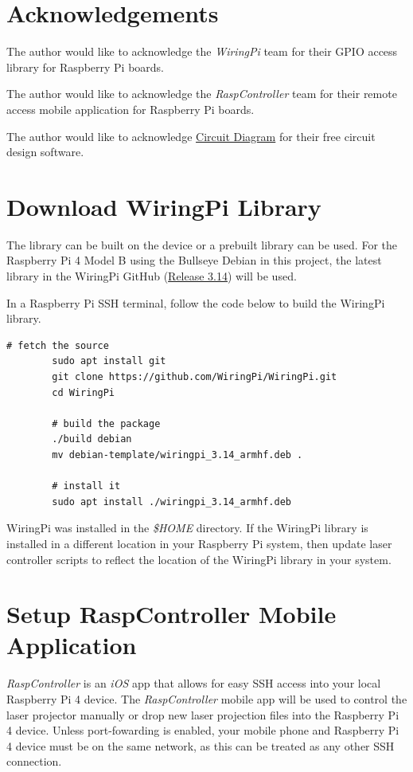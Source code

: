 \documentclass[journal]{IEEEtran}
\begin{document}
    \newpage
    \section{Acknowledgements}
    The author would like to acknowledge the \emph{WiringPi} team for their GPIO access library for Raspberry Pi boards. \newline

    The author would like to acknowledge the \emph{RaspController} team for their remote access mobile application for Raspberry Pi boards.

    The author would like to acknowledge {\href{https://www.circuit-diagram.org/editor/}{Circuit Diagram}} for their free circuit design software. 

    \newpage
    \appendices
    \section{Download WiringPi Library}
    The library can be built on the device or a prebuilt library can be used. 
    For the Raspberry Pi 4 Model B using the Bullseye Debian in this project, the latest library in the WiringPi GitHub ({\href{https://github.com/WiringPi/WiringPi/releases/tag/3.14}{Release 3.14}}) will be used.

    In a Raspberry Pi SSH terminal, follow the code below to build the WiringPi library.
    \begin{lstlisting}[frame=single, basicstyle=\ttfamily\footnotesize, breaklines=true]
        # fetch the source
        sudo apt install git
        git clone https://github.com/WiringPi/WiringPi.git
        cd WiringPi

        # build the package
        ./build debian
        mv debian-template/wiringpi_3.14_armhf.deb .

        # install it
        sudo apt install ./wiringpi_3.14_armhf.deb
    \end{lstlisting}

    WiringPi was installed in the \emph{\$HOME} directory. 
    If the WiringPi library is installed in a different location in your Raspberry Pi system, then update laser controller scripts to reflect the location of the WiringPi library in your system.

    \section{Setup RaspController Mobile Application}
    \emph{RaspController} is an \emph{iOS} app that allows for easy SSH access into your local Raspberry Pi 4 device.
    The \emph{RaspController} mobile app will be used to control the laser projector manually or drop new laser projection files into the Raspberry Pi 4 device.
    Unless port-fowarding is enabled, your mobile phone and Raspberry Pi 4 device must be on the same network, as this can be treated as any other SSH connection.
\end{document}
